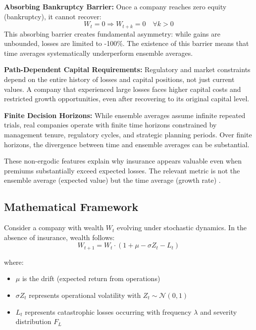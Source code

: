 \documentclass[11pt,letterpaper]{article}
\begin{document}
\textbf{Absorbing Bankruptcy Barrier:} Once a company reaches zero equity (bankruptcy), it cannot recover:
\begin{equation}
W_t = 0 \Rightarrow W_{t+k} = 0 \quad \forall k > 0
\end{equation}
This absorbing barrier creates fundamental asymmetry: while gains are unbounded, losses are limited to -100\%. The existence of this barrier means that time averages systematically underperform ensemble averages.

\textbf{Path-Dependent Capital Requirements:} Regulatory and market constraints depend on the entire history of losses and capital positions, not just current values. A company that experienced large losses faces higher capital costs and restricted growth opportunities, even after recovering to its original capital level.

\textbf{Finite Decision Horizons:} While ensemble averages assume infinite repeated trials, real companies operate with finite time horizons constrained by management tenure, regulatory cycles, and strategic planning periods. Over finite horizons, the divergence between time and ensemble averages can be substantial.

These non-ergodic features explain why insurance appears valuable even when premiums substantially exceed expected losses. The relevant metric is not the ensemble average (expected value) but the time average (growth rate) \citep{peters2011time}.

\subsection{Mathematical Framework}

Consider a company with wealth $W_t$ evolving under stochastic dynamics. In the absence of insurance, wealth follows:
\begin{equation}
W_{t+1} = W_t \cdot \left(1 + \mu - \sigma Z_t - L_t\right)
\end{equation}

where:
\begin{itemize}
    \item $\mu$ is the drift (expected return from operations)
    \item $\sigma Z_t$ represents operational volatility with $Z_t \sim \mathcal{N}(0,1)$
    \item $L_t$ represents catastrophic losses occurring with frequency $\lambda$ and severity distribution $F_L$
\end{itemize}
\end{document}
